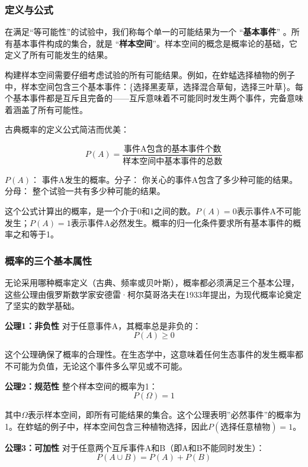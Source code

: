 \documentclass[
  twoside]{book}
\begin{document}
\hypertarget{ux5b9aux4e49ux4e0eux516cux5f0f}{%
\subsubsection{定义与公式}\label{ux5b9aux4e49ux4e0eux516cux5f0f}}

在满足``等可能性''的试验中，我们称每个单一的可能结果为一个 ``\textbf{基本事件}'' 。所有基本事件构成的集合，就是 ``\textbf{样本空间}''。样本空间的概念是概率论的基础，它定义了所有可能发生的结果。

构建样本空间需要仔细考虑试验的所有可能结果。例如，在蚱蜢选择植物的例子中，样本空间包含三个基本事件：\{选择黑麦草，选择混合草甸，选择三叶草\}。每个基本事件都是互斥且完备的------互斥意味着不可能同时发生两个事件，完备意味着涵盖了所有可能性。

古典概率的定义公式简洁而优美：

\[P(A) = \frac{\text{事件A包含的基本事件个数}}{\text{样本空间中基本事件的总数}}\]

\(P(A)\)： 事件A发生的概率。分子： 你关心的事件A包含了多少种可能的结果。分母： 整个试验一共有多少种可能的结果。

这个公式计算出的概率，是一个介于0和1之间的数。\(P(A)=0\)表示事件A不可能发生；\(P(A)=1\)表示事件A必然发生。概率的归一化条件要求所有基本事件的概率之和等于1。

\hypertarget{ux6982ux7387ux7684ux4e09ux4e2aux57faux672cux5c5eux6027}{%
\subsubsection{概率的三个基本属性}\label{ux6982ux7387ux7684ux4e09ux4e2aux57faux672cux5c5eux6027}}

无论采用哪种概率定义（古典、频率或贝叶斯），概率都必须满足三个基本公理，这些公理由俄罗斯数学家安德雷·柯尔莫哥洛夫在1933年提出，为现代概率论奠定了坚实的数学基础。

\textbf{公理1：非负性}
对于任意事件A，其概率总是非负的：
\[P(A) \geq 0\]

这个公理确保了概率的合理性。在生态学中，这意味着任何生态事件的发生概率都不可能为负值，无论这个事件多么罕见或不可能。

\textbf{公理2：规范性}
整个样本空间的概率为1：
\[P(\Omega) = 1\]

其中\(\Omega\)表示样本空间，即所有可能结果的集合。这个公理表明''必然事件''的概率为1。在蚱蜢的例子中，样本空间包含三种植物选择，因此\(P(\text{选择任意植物}) = 1\)。

\textbf{公理3：可加性}
对于任意两个互斥事件A和B（即A和B不能同时发生）：
\[P(A \cup B) = P(A) + P(B)\]
\end{document}
